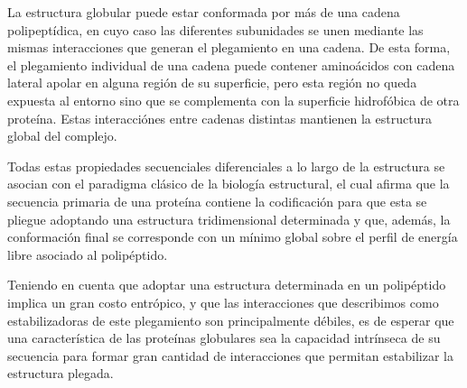 La estructura globular puede estar conformada por más de una cadena polipeptídica, en cuyo caso las diferentes subunidades se unen mediante las mismas interacciones que generan el plegamiento en una cadena.
De esta forma, el plegamiento individual de una cadena puede contener aminoácidos con cadena lateral apolar en alguna región de su superficie, pero esta región no queda expuesta al entorno sino que se complementa 
con la superficie hidrofóbica de otra proteína. Estas interacciónes entre cadenas distintas mantienen la estructura global del complejo.



Todas estas propiedades secuenciales diferenciales a lo largo de la estructura se asocian con el paradigma clásico de la biología estructural, el cual afirma que la secuencia primaria de una proteína 
contiene la codificación para que esta se pliegue adoptando una estructura tridimensional determinada y que, además, la conformación final se corresponde con un mínimo global sobre el perfil de energía libre asociado al polipéptido.  


Teniendo en cuenta que adoptar una estructura determinada en un polipéptido implica un gran costo entrópico, y que las interacciones que describimos como estabilizadoras de este plegamiento son principalmente débiles, 
es de esperar que una característica de las proteínas globulares sea la capacidad intrínseca de su secuencia para formar gran cantidad de interacciones que permitan estabilizar la estructura plegada.





